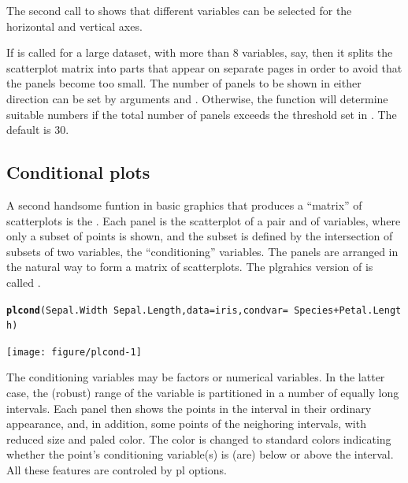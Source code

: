 \documentclass[11pt]{article}\usepackage[]{graphicx}\usepackage[]{color}
\makeatletter
\newcommand{\hlopt}[1]{\textcolor[rgb]{0,0,0}{#1}}%
\newcommand{\hlstd}[1]{\textcolor[rgb]{0.345,0.345,0.345}{#1}}%
\newcommand{\hlkwc}[1]{\textcolor[rgb]{0.333,0.667,0.333}{#1}}%
\newcommand{\hlkwd}[1]{\textcolor[rgb]{0.737,0.353,0.396}{\textbf{#1}}}%
\newenvironment{kframe}{%
 \def\at@end@of@kframe{}%
 \ifinner\ifhmode%
  \def\at@end@of@kframe{\end{minipage}}%
  \begin{minipage}{\columnwidth}%
 \fi\fi%
 \def\FrameCommand##1{\hskip\@totalleftmargin \hskip-\fboxsep
 \colorbox{shadecolor}{##1}\hskip-\fboxsep
     \hskip-\linewidth \hskip-\@totalleftmargin \hskip\columnwidth}%
 \MakeFramed {\advance\hsize-\width
   \@totalleftmargin\z@ \linewidth\hsize
   \@setminipage}}%
 {\par\unskip\endMakeFramed%
 \at@end@of@kframe}
\newenvironment{knitrout}{}{} %
\makeatother
\begin{document}
The second call to  shows that different variables can be
selected for the horizontal and vertical axes. 

If  is called for a large dataset, with more than 8 variables, 
say, then it splits the scatterplot matrix into parts that appear on
separate pages in order to avoid that the panels become too small.
The number of panels to be shown in either direction can be set by 
arguments  and . 
Otherwise, the function will determine suitable numbers 
if the total number of panels exceeds the threshold set in 
. The default is 30.

\subsection{Conditional plots}
A second handsome funtion in basic graphics that produces a ``matrix''
of scatterplots is the . 
Each panel is the scatterplot of a pair  and  of variables,
where only a subset of points is shown, and the subset is defined
by the intersection of subsets of two variables, the ``conditioning''
variables. The panels are arranged in the natural way to form
a matrix of scatterplots.
The plgrahics version of  is called .

\begin{knitrout}
\color{fgcolor}\begin{kframe}
\begin{alltt}
\hlkwd{plcond}\hlstd{(Sepal.Width}\hlopt{~}\hlstd{Sepal.Length,} \hlkwc{data}\hlstd{=iris,} \hlkwc{condvar}\hlstd{=}\hlopt{~}\hlstd{Species}\hlopt{+}\hlstd{Petal.Length)}
\end{alltt}
\end{kframe}
\texttt{[image: figure/plcond-1]} 

\end{knitrout}
The conditioning variables may be factors or numerical variables.
In the latter case, the (robust) range of the variable is partitioned
in a number of equally long intervals. 
Each panel then shows the points in the interval in their ordinary appearance,
and, in addition, some points of the neighoring intervals, with reduced size
and paled color. The color is changed to standard colors indicating whether 
the point's conditioning variable(s) is (are) below or above the interval.
All these features are controled by pl options.
\end{document}
